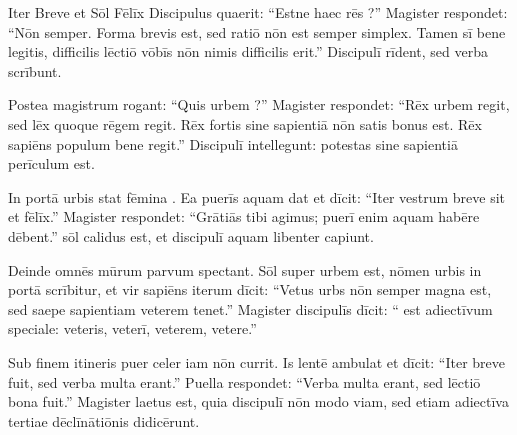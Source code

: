 \documentclass[12pt]{nextbook}
\begin{document}
\begin{readersection}{Iter Breve et Sōl Fēlīx}
Discipulus quaerit: “Estne haec rēs ?” Magister respondet: “Nōn semper. Forma brevis est, sed ratiō nōn est semper simplex. Tamen sī bene legitis, difficilis lēctiō vōbīs nōn nimis difficilis erit.” Discipulī rīdent, sed verba scrībunt.

Postea magistrum rogant: “Quis urbem ?” Magister respondet: “Rēx urbem regit, sed lēx quoque rēgem regit. Rēx fortis sine sapientiā nōn satis bonus est. Rēx sapiēns populum bene regit.” Discipulī intellegunt: potestas sine sapientiā perīculum est.

In portā urbis stat fēmina . Ea puerīs aquam dat et dīcit: “Iter vestrum breve sit et fēlīx.” Magister respondet: “Grātiās tibi agimus; puerī enim aquam habēre dēbent.”  sōl calidus est, et discipulī aquam libenter capiunt.

Deinde omnēs  mūrum parvum spectant. Sōl super urbem est, nōmen urbis in portā scrībitur, et vir sapiēns iterum dīcit: “Vetus urbs nōn semper magna est, sed saepe sapientiam veterem tenet.” Magister discipulīs dīcit: “ est adiectīvum speciale: veteris, veterī, veterem, vetere.”

Sub finem itineris puer celer iam nōn currit. Is lentē ambulat et dīcit: “Iter breve fuit, sed verba multa erant.” Puella respondet: “Verba multa erant, sed lēctiō bona fuit.” Magister laetus est, quia discipulī nōn modo viam, sed etiam adiectīva tertiae dēclīnātiōnis didicērunt.

\end{readersection}
\end{document}
